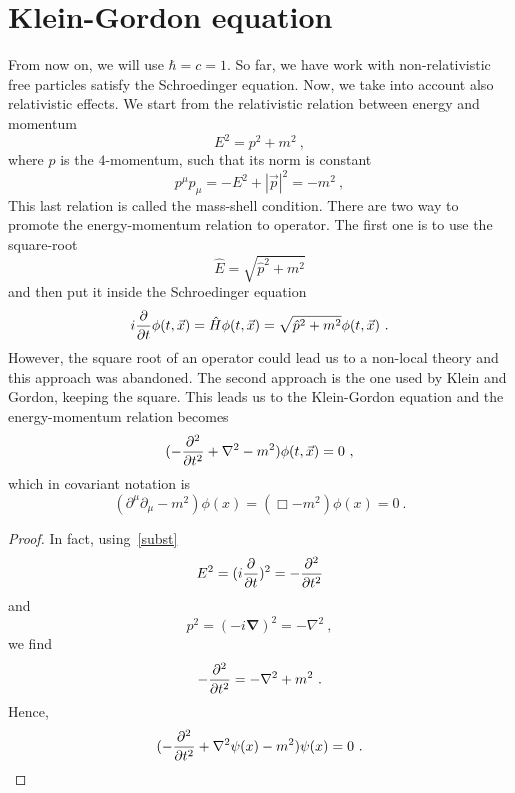 \section{Klein-Gordon equation}

    From now on, we will use $\hbar = c = 1$. So far, we have work with non-relativistic free particles satisfy the Schroedinger equation. Now, we take into account also relativistic effects. We start from the relativistic relation between energy and momentum
    \begin{equation}\label{enmom}
        E^2 = p^2 + m^2 ~,
    \end{equation}
    where $p$ is the $4$-momentum, such that its norm is constant
    \begin{equation}\label{shell}
        p^\mu p_\mu = - E^2 + |\vec p|^2 = - m^2 ~,
    \end{equation}
    This last relation is called the mass-shell condition. 
    There are two way to promote the energy-momentum relation to operator. The first one is to use the square-root 
    \begin{equation*}
        \hat E = \sqrt{\hat p^2 + m^2}
    \end{equation*}
    and then put it inside the Schroedinger equation 
    \begin{equation*}
        i \frac{\partial}{\partial t} \phi(t, \vec x) = \hat H \phi(t, \vec x) = \sqrt{\hat p^2 + m^2} \phi(t, \vec x) ~.
    \end{equation*}
    However, the square root of an operator could lead us to a non-local theory and this approach was abandoned. The second approach is the one used by Klein and Gordon, keeping the square. This leads us to the Klein-Gordon equation 
    and the energy-momentum relation becomes 
    \begin{equation*}
        (- \frac{\partial^2 }{\partial t^2} + \nabla^2 - m^2) \phi(t, \vec x) = 0 ~,
    \end{equation*}
    which in covariant notation is 
    \begin{equation}\label{kgeq}
        (\partial^\mu \partial_\mu - m^2) \phi(x) = (\Box - m^2) \phi(x) = 0 ~.
    \end{equation}
    \begin{proof}
        In fact, using~\eqref{subst} 
        \begin{equation*}
            E^2 = (i \frac{\partial}{\partial t} )^2 = - \frac{\partial^2 }{\partial t^2} 
        \end{equation*}
        and 
        \begin{equation*}
            p^2 = (- i \boldsymbol \nabla)^2 = - \nabla^2 ~,
        \end{equation*}
        we find 
        \begin{equation*}
            - \frac{\partial^2 }{\partial t^2} = - \nabla^2  + m^2  ~.
        \end{equation*}
        Hence, 
        \begin{equation*}
            (- \frac{\partial^2 }{\partial t^2} + \nabla^2 \psi(x) - m^2 ) \psi(x) = 0 ~.
        \end{equation*}
    \end{proof}

